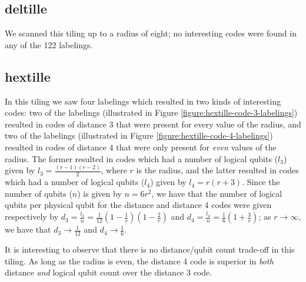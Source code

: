 \documentclass[12pt]{amsbook}
\theoremstyle{plain}
\theoremstyle{definition}
\theoremstyle{remark}
\newcommand{\paren}[1]{\left(#1\right)}
\begin{document}
\subsection{deltille}

We scanned this tiling up to a radius of eight;  no interesting codes were found in any of the 122 labelings.
\subsection{hextille}

In this tiling we saw four labelings which resulted in two kinds of interesting codes:  two of the labelings (illustrated in Figure \ref{figure:hextille-code-3-labelings}) resulted in codes of distance 3 that were present for every value of the radius, and two of the labelings (illustrated in Figure \ref{figure:hextille-code-4-labelings}) resulted in codes of distance 4 that were only present for \emph{even} values of the radius.  The former resulted in codes which had a number of logical qubits ($l_3$) given by $l_3=\frac{(r-1)(r-2)}{2}$, where $r$ is the radius, and the latter resulted in codes which had a number of logical qubits ($l_4$) given by $l_4=r(r+3)$.  Since the number of qubits ($n$) is given by $n=6r^2$, we have that the number of logical qubits per physical qubit for the distance and distance 4 codes were given respectively by $d_3=\frac{l_3}{n}=\frac{1}{12}\paren{1-\frac{1}{r}}\paren{1-\frac{2}{r}}$ and $d_4=\frac{l_4}{n}=\frac{1}{6}\paren{1+\frac{3}{r}}$;  as $r\to\infty$, we have that $d_3\to\frac{1}{12}$ and $d_4\to\frac{1}{6}$.

It is interesting to observe that there is no distance/qubit count trade-off in this tiling.  As long as the radius is even, the distance 4 code is superior in \emph{both} distance \emph{and} logical qubit count over the distance 3 code.
\end{document}
